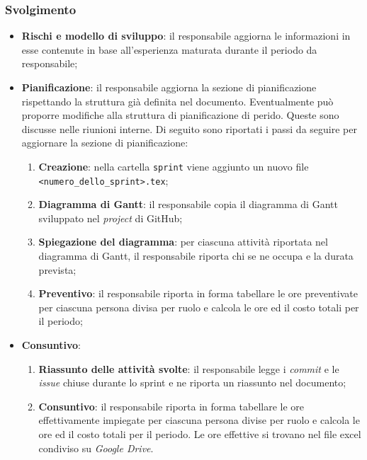 \subsubsection{Svolgimento}
\begin{itemize}
	\item \textbf{Rischi e modello di sviluppo}: il responsabile aggiorna
	      le informazioni in esse contenute in base all'esperienza maturata
	      durante il periodo da responsabile;

	\item \textbf{Pianificazione}: il responsabile aggiorna la sezione di
	      pianificazione rispettando la struttura già definita nel documento.
	      Eventualmente può proporre modifiche alla struttura di pianificazione
	      di perido. Queste sono discusse nelle riunioni interne.
	      Di seguito sono riportati i passi da seguire per aggiornare la sezione
	      di pianificazione:
	      \begin{enumerate}
		      \item \textbf{Creazione}: nella cartella \texttt{sprint} viene
		            aggiunto un nuovo file \texttt{<numero\_dello\_sprint>.tex};

		      \item \textbf{Diagramma di Gantt}: il responsabile copia il
		            diagramma di Gantt sviluppato nel \textit{project} di
		            GitHub;

		      \item \textbf{Spiegazione del diagramma}: per ciascuna attività
		            riportata nel diagramma di Gantt, il responsabile riporta
		            chi se ne occupa e la durata prevista;

		      \item \textbf{Preventivo}: il responsabile riporta in forma
		            tabellare le ore preventivate per ciascuna persona divisa
		            per ruolo e calcola le ore ed il costo totali per il
		            periodo;
	      \end{enumerate}

	\item \textbf{Consuntivo}:
	      \begin{enumerate}
		      \item \textbf{Riassunto delle attività svolte}: il responsabile
		            legge i \textit{commit} e le \textit{issue} chiuse durante
		            lo sprint e ne riporta un riassunto nel documento;

		      \item \textbf{Consuntivo}: il responsabile riporta in forma
		            tabellare le ore effettivamente impiegate per ciascuna
		            persona divise per ruolo e calcola le ore ed il costo
		            totali per il periodo. Le ore effettive si trovano nel file
		            excel condiviso su \textit{Google Drive}.


\end{enumerate}
\end{itemize}
